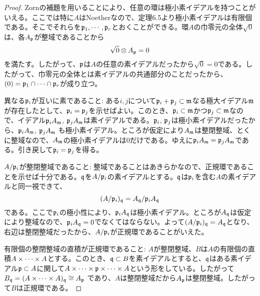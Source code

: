 \begin{proof}
  Zornの補題を用いることにより、任意の環は極小素イデアルを持つことがいえる。ここでは特に$A$はNoetherなので、定理6.5より極小素イデアルは有限個である。そこでそれらを$\mathfrak{p}_1, \cdots ,\mathfrak{p}_r$とおくことができる。環$A$の巾零元の全体$\sqrt{0}$は、各$A_{\mathfrak{p}}$が整域であることから
  \[
  \sqrt{0} \otimes A_{\mathfrak{p}} = 0
  \]
  を満たす。したがって、$\mathfrak{p}$は$A$の任意の素イデアルだったから$\sqrt{0}=0$である。したがって、巾零元の全体とは素イデアルの共通部分のことだったから、$(0) = \mathfrak{p}_1 \cap \cdots \cap \mathfrak{p}_r$が成り立つ。

  異なる$\mathfrak{p}_i$が互いに素であること: ある$i,j$について$\mathfrak{p}_i + \mathfrak{p}_j \subset \mathfrak{m}$なる極大イデアル$\mathfrak{m}$が存在したとして、$\mathfrak{p}_i = \mathfrak{p}_j$を示せばよい。このとき、$\mathfrak{p}_i \subset \mathfrak{m}$かつ$\mathfrak{p}_j \subset \mathfrak{m}$なので、イデアル$\mathfrak{p}_i A_{\mathfrak{m}}$, $\mathfrak{p}_j A_{\mathfrak{m}}$は素イデアルである。$\mathfrak{p}_i$, $\mathfrak{p}_j$は極小素イデアルだったから、$\mathfrak{p}_i A_{\mathfrak{m}}$, $\mathfrak{p}_j A_{\mathfrak{m}}$
  も極小素イデアル。ところが仮定により$A_{\mathfrak{m}}$は整閉整域、とくに整域なので、$A_{\mathfrak{m}}$の極小素イデアルは$0$だけである。ゆえに$\mathfrak{p}_i A_{\mathfrak{m}}=\mathfrak{p}_j A_{\mathfrak{m}}$である。引き戻して$\mathfrak{p}_i = \mathfrak{p}_j$を得る。

 $A/\mathfrak{p}_i$が整閉整域であること: 整域であることはあきらかなので、正規環であることを示せば十分である。$\mathfrak{q}$を$A/\mathfrak{p}_i$の素イデアルとする。$\mathfrak{q}$は$\mathfrak{p}_i$を含む$A$の素イデアルと同一視できて、
 \[
 (A/\mathfrak{p}_i)_{\mathfrak{q}} = A_{\mathfrak{q}} / \mathfrak{p}_i A_{\mathfrak{q}}
 \]
 である。ここで$\mathfrak{p}_i$の極小性により、$ \mathfrak{p}_i A_{\mathfrak{q}}$は極小素イデアル。ところが$A_{\mathfrak{q}}$は仮定により整域なので、$\mathfrak{p}_i A_{\mathfrak{q}} = 0$でなくてはならない。よって$(A/\mathfrak{p}_i)_{\mathfrak{q}} = A_{\mathfrak{q}}$となり、右辺は整閉整域だったから、$A/\mathfrak{p}_i$が正規環であることがいえた。

 有限個の整閉整域の直積が正規環であること: $A$が整閉整域、$B$は$A$の有限個の直積$A \times \cdots \times A$とする。このとき、$\mathfrak{q} \subset B$を素イデアルとすると、$\mathfrak{q}$はある素イデアル$\mathfrak{p} \subset A$に関して$A \times \cdots \times \mathfrak{p} \times \cdots \times A$という形をしている。したがって$B_{\mathfrak{q}} = (A \times \cdots \times A)_{\mathfrak{q}} \cong A_{\mathfrak{p}}$
 であり、$A$は整閉整域だから$A_{\mathfrak{p}}$は整閉整域。したがって$B$は正規環である。
\end{proof}
